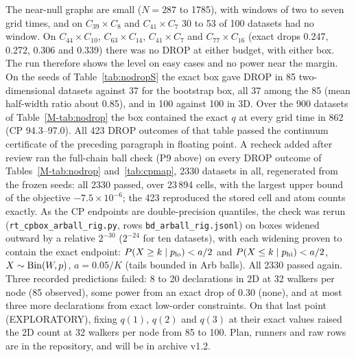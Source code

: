 \documentclass[aps,pre,twocolumn,superscriptaddress,nofootinbib,10pt]{revtex4-2}
\begin{document}
The near-null graphs are small ($N=287$ to 1785), with windows of two to seven grid times, and on $C_{39}\times C_8$ and $C_{41}\times C_7$ 30 to 53 of 100 datasets had no window. On $C_{44}\times C_{10}$, $C_{63}\times C_{14}$, $C_{41}\times C_7$ and $C_{77}\times C_{16}$ (exact drops 0.247, 0.272, 0.306 and 0.339) there was no DROP at either budget, with either box. The run therefore shows the level on easy cases and no power near the margin. On the seeds of Table~\ref{tab:nodropS} the exact box gave DROP in 85 two-dimensional datasets against 37 for the bootstrap box, all 37 among the 85 (mean half-width ratio about 0.85), and in 100 against 100 in 3D. Over the 900 datasets of Table~\ref{M-tab:nodrop} the box contained the exact $q$ at every grid time in 862 (CP 94.3--97.0). All 423 DROP outcomes of that table passed the continuum certificate of the preceding paragraph in floating point. A recheck added after review ran the full-chain ball check (P9 above) on every DROP outcome of Tables~\ref{M-tab:nodrop} and~\ref{tab:cpmap}, 2330 datasets in all, regenerated from the frozen seeds: all 2330 passed, over 23\,894 cells, with the largest upper bound of the objective $-7.5\times10^{-6}$; the 423 reproduced the stored cell and atom counts exactly. As the CP endpoints are double-precision quantiles, the check was rerun (\texttt{rt\_cpbox\_arball\_rig.py}, rows \texttt{bd\_arball\_rig.jsonl}) on boxes widened outward by a relative $2^{-30}$ ($2^{-24}$ for ten datasets), with each widening proven to contain the exact endpoint: $P(X\ge k\mid p_{\rm lo})<a/2$ and $P(X\le k\mid p_{\rm hi})<a/2$, $X\sim{\rm Bin}(W,p)$, $a=0.05/K$ (tails bounded in Arb balls). All 2330 passed again. Three recorded predictions failed: 8 to 20 declarations in 2D at 32 walkers per node (85 observed), some power from an exact drop of 0.30 (none), and at most three more declarations from exact low-order constraints. On that last point (EXPLORATORY), fixing $q(1)$, $q(2)$ and $q(3)$ at their exact values raised the 2D count at 32 walkers per node from 85 to 100. Plan, runners and raw rows are in the repository, and will be in archive v1.2.
\end{document}
